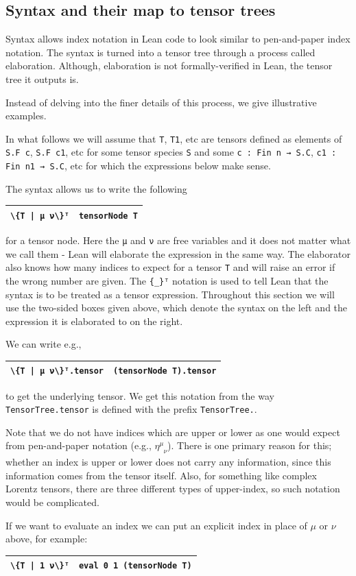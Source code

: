 \documentclass[a4paper, 11pt]{article}
\DeclareRobustCommand{\myinline}{\lstinline}
\newcommand{\syntaxElab}[2]{ 
  \arrayrulecolor{mycolor}
  \begin{center}
    \begin{tabular}{|p{1.7in} | p{4in}|}
    \hline
    \hfill {#1} & {#2} \\
    \hline
    \end{tabular}
    \end{center}
  \arrayrulecolor{black}
}
\begin{document}
\subsection{Syntax and their map to tensor trees}

Syntax allows index notation in Lean code to look similar to 
pen-and-paper index notation. 
The syntax is turned into a tensor tree through a process called elaboration. 
Although, elaboration is not formally-verified in Lean, the tensor tree it outputs is.

Instead of delving into the finer details of this process, 
we give illustrative examples. 

In what follows we will assume that \myinline|T|, \myinline|T1|, etc are tensors defined as 
elements of \myinline|S.F c|, \myinline|S.F c1|, etc for 
some tensor species \myinline|S| and some \myinline|c : Fin n → S.C|, \myinline|c1 : Fin n1 → S.C|, etc 
for which the expressions below make sense.

The syntax allows us to write the following 
\syntaxElab{\lstinline!\{T | μ ν\}ᵀ!}{{\lstinline!tensorNode T!}}
for a tensor node. Here the \myinline|μ| and \myinline|ν| are free variables and it does not 
matter what we call them - Lean will elaborate the expression in the same way.
The elaborator also knows how many indices to expect for a tensor \myinline|T| and will raise an error if
the wrong number are given. The \myinline|{_}ᵀ| notation is used to tell Lean that the syntax
is to be treated as a tensor expression. Throughout this section we will use the two-sided boxes 
given above, which denote the syntax on the left and the expression it is elaborated to on the right. 

We can write e.g.,
\syntaxElab{\lstinline!\{T | μ ν\}ᵀ.tensor!}{{\lstinline!(tensorNode T).tensor!}}
to get the underlying tensor. We get this notation from the way \myinline|TensorTree.tensor|
is defined with the prefix \myinline|TensorTree.|.

Note that we do not have indices which are upper or lower as one would expect from pen-and-paper notation
 (e.g., $\eta^\mu_{\phantom{\mu}\nu}$).
There is one primary reason for this; whether an index is upper or lower does not carry any information, 
since this information comes from the tensor itself. Also, for something like complex Lorentz tensors, 
there are three different types of upper-index, so such notation would be complicated. 

If we want to evaluate an index we can put an explicit index in place of $\mu$ or $\nu$ above, 
for example:
\syntaxElab{\lstinline!\{T | 1 ν\}ᵀ!}{\lstinline!eval 0 1 (tensorNode T)!}
\end{document}
